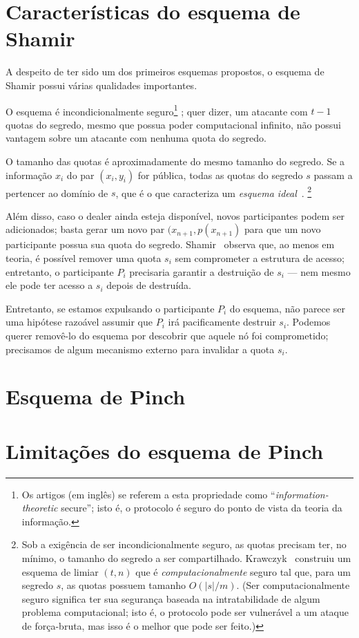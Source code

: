 \documentclass[10pt,twocolumn]{article}
\theoremstyle{definition}
\begin{document}
\section{Características do esquema de Shamir}

A despeito de ter sido um dos primeiros esquemas propostos,
o esquema de Shamir possui várias qualidades importantes.

O esquema é incondicionalmente seguro\footnote{
    Os artigos (em inglês)
    se referem a esta propriedade como
    ``\emph{information-theoretic} secure'';
    isto é,
    o protocolo é seguro do ponto de vista da teoria da informação.
}
\cite{Krawczyk1993};
quer dizer,
um atacante com $t-1$ quotas do segredo,
mesmo que possua poder computacional infinito,
não possui vantagem sobre um atacante com nenhuma quota do segredo.

O tamanho das quotas é aproximadamente do mesmo tamanho do segredo.
Se a informação $x_i$ do par $(x_i, y_i)$ for pública,
todas as quotas do segredo $s$ passam a pertencer ao domínio de $s$,
que é o que caracteriza um \emph{esquema ideal}~\cite{Brickell1990}.
\footnote{
    Sob a exigência de ser incondicionalmente seguro,
    as quotas precisam ter, no mínimo,
    o tamanho do segredo a ser compartilhado.
    Krawczyk~\cite{Krawczyk1993} construiu um esquema de limiar $(t, n)$
    que é \emph{computacionalmente} seguro
    tal que, para um segredo $s$,
    as quotas possuem tamanho $O(|s|/m)$.
    (Ser computacionalmente seguro
    significa ter sua segurança
    baseada na intratabilidade de algum problema computacional;
    isto é,
    o protocolo pode ser vulnerável a um ataque de força-bruta,
    mas isso é o melhor que pode ser feito.)
}

Além disso,
caso o dealer ainda esteja disponível,
novos participantes podem ser adicionados;
basta gerar um novo par $(x_{n+1}, p(x_{n+1})$
para que um novo participante possua sua quota do segredo.
Shamir~\cite{Shamir1979} observa que,
ao menos em teoria,
é possível remover uma quota $s_i$ sem comprometer a estrutura de acesso;
entretanto,
o participante $P_i$ precisaria garantir a destruição de $s_i$
--- nem mesmo ele pode ter acesso a $s_i$ depois de destruída.

Entretanto,
se estamos expulsando o participante $P_i$ do esquema,
não parece ser uma hipótese razoável
assumir que $P_i$ irá pacificamente destruir $s_i$.
Podemos querer removê-lo do esquema
por descobrir que aquele nó foi comprometido;
precisamos de algum mecanismo externo para invalidar a quota $s_i$.

\section{Esquema de Pinch}
\section{Limitações do esquema de Pinch}


\end{document}
